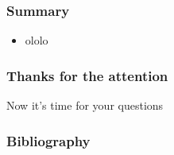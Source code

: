 \documentclass{beamer}
\begin{document}

	\begin{frame}
		\frametitle{Summary}
		\begin{itemize}
			\item
				ololo
		\end{itemize}
	\end{frame}


	\begin{frame}
		\frametitle{Thanks for the attention}
		Now it's time for your questions
		\begin{figure}[h]
		\end{figure}
	\end{frame}
	
	\begin{frame}[allowframebreaks]
		\frametitle{Bibliography}    
			
			
	\end{frame}
		
\end{document}
